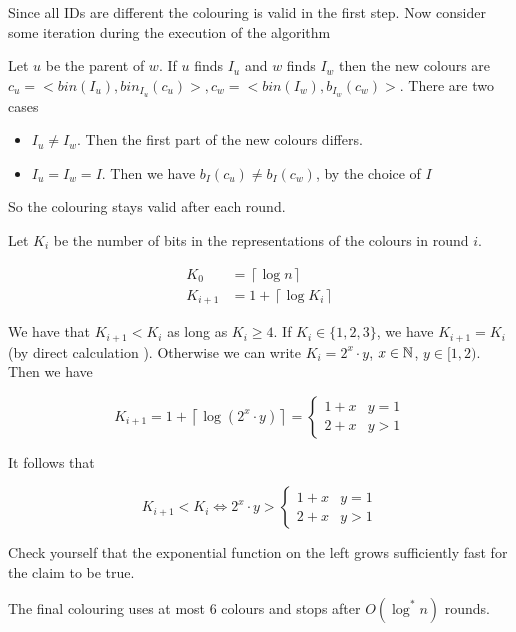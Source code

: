 \begin{pr} Since all IDs are different the colouring is valid in the first step. Now consider some iteration during the execution of the algorithm

Let $u$ be the parent of $w$. If $u$ finds $I_u$ and $w$ finds $I_w$ then the new colours are $c_u=<bin(I_u), bin_{I_u}(c_u)>, c_w=<bin(I_w),b_{I_w}(c_w)>$. There are two cases

\begin{itemize}
\item $I_u\neq I_w$. Then the first part of the new colours differs. \ok
\item $I_u=I_w=I$. Then we have $b_I(c_u)\neq b_I(c_w)$, by the choice of $I$ \ok
\end{itemize}

So the colouring stays valid after each round.
\end{pr}

\begin{lem} Let $K_i$ be the number of bits in the representations of the colours in round $i$.

\begin{align*}
K_0 &= \left\lceil \log n\right\rceil\\
K_{i+1} &= 1+\left\lceil\log K_i\right\rceil
\end{align*}

\end{lem}

\begin{pr}
We have that $K_{i+1} < K_i$ as long as $K_i\geq 4$. If $K_i\in \{1,2,3\}$, we have $K_{i+1}=K_i$ (by direct calculation \ok). Otherwise we can write $K_i=2^x\cdot y$, $x\in \mathbb{N}$, $y\in [1,2)$. Then we have

\[K_{i+1} = 1+\left\lceil \log(2^x\cdot y)\right\rceil = \begin{cases} 1+x & y=1\\ 2+x &y>1\end{cases}\]

It follows that

\[K_{i+1}<K_i \Leftrightarrow 2^x\cdot y > \begin{cases} 1+x & y=1\\ 2+x &y>1\end{cases}\]

Check yourself that the exponential function on the left grows sufficiently fast for the claim to be true.
\end{pr}

\begin{thm} The final colouring uses at most 6 colours and stops after $O(\log^* n)$ rounds.\end{thm}

